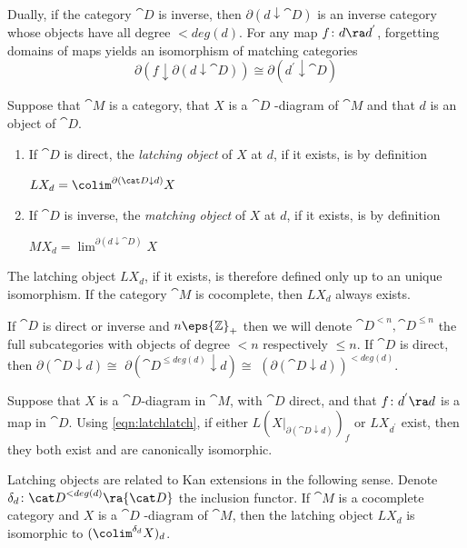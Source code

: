 Dually, if the category ${\cat D}$ is inverse, then $\partial(d \downarrow {\cat D})$ is an inverse category whose objects have all degree $< deg(d)$. For any map $f \colon d \ra d^{'}$, forgetting domains of maps yields an isomorphism of matching categories
\begin{equation}
\label{eqn:matchmatch}
\partial( f \downarrow \partial(d \downarrow {\cat D})) \cong \partial (d^{'} \downarrow {\cat D})
\end{equation}

\begin{defn}
\label{def:latchingmatchingobject}
Suppose that ${\cat M}$ is a category, that $X$ is a ${\cat D}$ -diagram of ${\cat M}$ and that $d$ is an object of ${\cat D}$.
\begin{enumerate}
\item
If ${\cat D}$ is direct, the {\it latching object} of $X$ at $d$, if it exists, is by definition 
\begin{center}
$LX_d = \colim^{\partial({\cat D} \downarrow d)}X$
\end{center}
\item
If ${\cat D}$ is inverse, the {\it matching object} of $X$ at $d$, if it exists, is by definition 
\begin{center}
$MX_d = \lim^{\partial(d \downarrow {\cat D})}X$
\end{center}
\end{enumerate}
\end{defn}

The latching object $LX_d$, if it exists, is therefore defined only up to an unique isomorphism. If the category ${\cat M}$ is cocomplete, then $LX_d$ always exists.

If ${\cat D}$ is direct or inverse and $n \eps {\mathbb Z}_+$ then we will denote ${\cat D}^{<n}, {\cat D}^{\leq n}$ the full subcategories with objects of degree $< n$ respectively $\leq n$. If ${\cat D}$ is direct, then $\partial({\cat D} \downarrow d) \cong$ $\partial({\cat D}^{\leq deg(d)} \downarrow d) \cong$ $(\partial({\cat D} \downarrow d))^{< deg(d)}$. 

Suppose that $X$ is a ${\cat D}$-diagram in ${\cat M}$, with ${\cat D}$ direct, and that $f \colon d^{'} \ra d$ is a map in ${\cat D}$. Using \eqref{eqn:latchlatch}, if either $L(X|_{\partial({\cat D} \downarrow d)})_f$ or $LX_{d^{'}}$ exist, then they both exist and are canonically isomorphic.

Latching objects are related to Kan extensions in the following sense. Denote $\delta_d \colon {\cat D}^{<deg(d)} \ra {\cat D}$ the inclusion functor. If ${\cat M}$ is a cocomplete category and $X$ is a ${\cat D}$ -diagram of ${\cat M}$, then the latching object $LX_d$ is isomorphic to $(\colim^{\delta_d} X)_d$.


